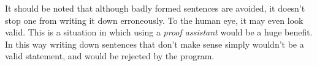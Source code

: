 \begin{remark}
    It should be noted that although badly formed sentences are avoided, it doesn't stop one from writing it down erroneously. To the human eye, it may even look valid. This is a situation in which using a \emph{proof assistant} would be a huge benefit. In this way writing down sentences that don't make sense simply wouldn't be a valid statement, and would be rejected by the program.
\end{remark}

